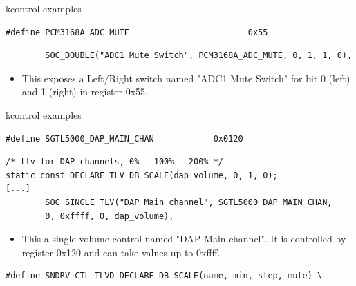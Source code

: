 \begin{frame}[fragile]{kcontrol examples}
  \begin{block}{}
    \fontsize{9}{9}\selectfont
    \begin{verbatim}
#define PCM3168A_ADC_MUTE                        0x55
    \end{verbatim}
  \end{block}
  \begin{block}{}
    \fontsize{9}{9}\selectfont
    \begin{verbatim}
        SOC_DOUBLE("ADC1 Mute Switch", PCM3168A_ADC_MUTE, 0, 1, 1, 0),
    \end{verbatim}
  \end{block}
  \begin{itemize}
  \item This exposes a Left/Right switch named "ADC1 Mute Switch" for
    bit 0 (left) and 1 (right) in register 0x55.
  \end{itemize}
\end{frame}


\begin{frame}[fragile]{kcontrol examples}
  \begin{block}{}
    \fontsize{9}{9}\selectfont
    \begin{verbatim}
#define SGTL5000_DAP_MAIN_CHAN            0x0120
    \end{verbatim}
  \end{block}
  \begin{block}{}
    \fontsize{9}{9}\selectfont
    \begin{verbatim}
/* tlv for DAP channels, 0% - 100% - 200% */
static const DECLARE_TLV_DB_SCALE(dap_volume, 0, 1, 0);
[...]
        SOC_SINGLE_TLV("DAP Main channel", SGTL5000_DAP_MAIN_CHAN,
        0, 0xffff, 0, dap_volume),
    \end{verbatim}
  \end{block}
  \begin{itemize}
  \item This a single volume control named "DAP Main channel".
    It is controlled by register 0x120 and can take values up to
    0xffff.
  \end{itemize}
  \begin{block}{}
    \fontsize{9}{9}\selectfont
    \begin{verbatim}
#define SNDRV_CTL_TLVD_DECLARE_DB_SCALE(name, min, step, mute) \
    \end{verbatim}
  \end{block}
\end{frame}

